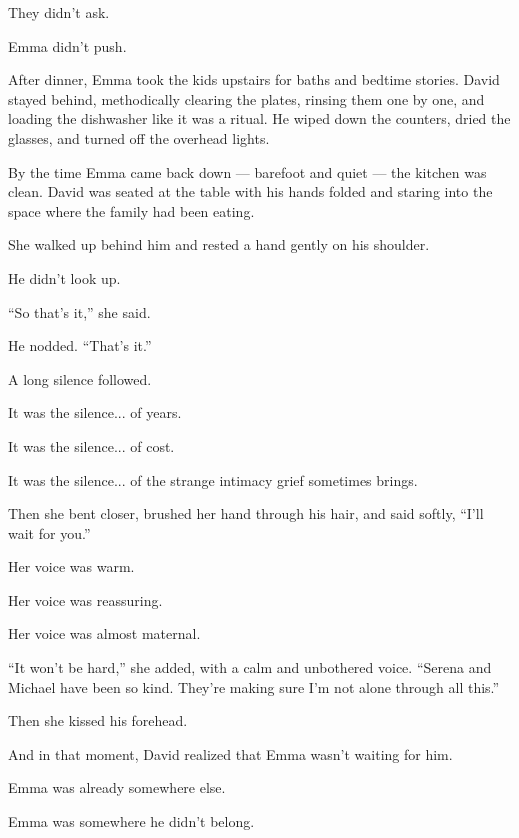 They didn’t ask.  

Emma didn’t push.

After dinner, Emma took the kids upstairs for baths and bedtime stories.
David stayed behind, methodically clearing the plates, rinsing them one by one, and loading the 
dishwasher like it was a ritual.
He wiped down the counters, dried the glasses, and turned off the overhead lights.

By the time Emma came back down --- barefoot and quiet --- the kitchen was clean.
David was seated at the table with his hands folded and staring into the space where the
family had been eating.

She walked up behind him and rested a hand gently on his shoulder.

He didn’t look up.

``So that’s it,'' she said.

He nodded. ``That’s it.''

A long silence followed. 

It was the silence... of years. 

It was the silence... of cost. 

It was the silence... of the strange intimacy grief sometimes brings.

Then she bent closer, brushed her hand through his hair, and said softly,  
``I’ll wait for you.''

Her voice was warm. 

Her voice was reassuring. 

Her voice was almost maternal.  

``It won’t be hard,'' she added, with a calm and unbothered voice.
``Serena and Michael have been so kind. They’re making sure I’m not alone through all this.''

Then she kissed his forehead.

And in that moment, David realized that 
Emma wasn’t waiting for him.  

Emma was already somewhere else.  

Emma was somewhere he didn't belong.

\medskip

